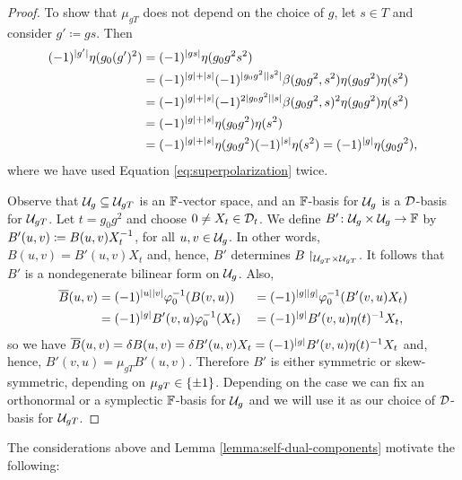 \begin{proof}
    To show that $\mu_{gT}$ does not depend on the choice of $g$, let $s \in T$ and consider $g' \coloneqq gs$. 
    Then 
    \begin{align*}
        (-1)^{|g'|} \eta(g_0 (g')^2) &= (-1)^{|gs|} \eta(g_0 g^2 s^2)\\
        &= (-1)^{|g| + |s|} (-1)^{|g_0 g^2||s^2|} \beta(g_0 g^2, s^2)\eta(g_0 g^2) \eta(s^2)\\
        &= (-1)^{|g| + |s|} (-1)^{2 |g_0 g^2| |s|} \beta(g_0 g^2, s)^2 \eta(g_0 g^2) \eta(s^2) \\
        &= (-1)^{|g| + |s|} \eta(g_0 g^2) \eta(s^2) \\ 
        &= (-1)^{|g| + |s|} \eta(g_0 g^2) (-1)^{|s|} \eta (s^2) = (-1)^{|g|} \eta(g_0 g^2),
    \end{align*}
    where we have used Equation \eqref{eq:superpolarization} twice. 
    
    Observe that $\mathcal U_g \subseteq \mathcal U_{gT}$ is an $\mathbb{F}$-vector space, and an $\mathbb{F}$-basis for $\mathcal U_g$ is a $\mathcal{D}$-basis for $\mathcal U_{gT}$. 
    Let $t=g_0 g^2$ and choose $0 \neq X_t \in \mathcal{D}_t$. 
    We define $B'\colon \mathcal U_g \times \mathcal U_g \to \mathbb{F}$ by $B'(u,v) \coloneqq B(u,v) X_t^{-1}$, for all $u, v \in \mathcal U_g$. 
    In other words, $B(u,v) = B'(u,v) X_t$ and, hence, $B'$ determines $B\restriction_{\mathcal U_{gT} \times \mathcal U_{gT}}$. 
    It follows that $B'$ is a nondegenerate bilinear form on $\mathcal U_g$. 
    Also, 
    \begin{alignat*}{3}
        \overline{B} (u, v) &= (-1)^{|u||v|} \varphi_0^{-1}( B(v, u) )
        &&= (-1)^{|g||g|} \varphi_0^{-1}( B'(v, u)X_t )\\
        &= (-1)^{|g|} B'(v, u) \varphi_0^{-1}(X_t)
        &&= (-1)^{|g|} B'(v, u) \eta(t)^{-1} X_t,
    \end{alignat*}
    so we have $\overline{B} (u, v) = \delta B (u, v) = \delta B' (u,v) X_t = (-1)^{|g|} B'(v, u) \eta(t)^{-1} X_t$ and, hence, $B'(v, u) = \mu_{gT} B'(u,v)$. 
    Therefore $B'$ is either symmetric or skew-symmetric, depending on $\mu_{gT} \in \{ \pm 1 \}$.
    Depending on the case we can fix an orthonormal or a symplectic $\mathbb{F}$-basis for $\mathcal U_g$ and we will use it as our choice of $\mathcal{D}$-basis for $\mathcal U_{gT}$. 
\end{proof}

The considerations above and Lemma \ref{lemma:self-dual-components} motivate the following:


